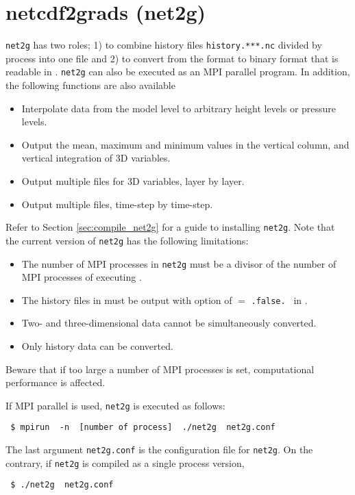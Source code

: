 \section{netcdf2grads (net2g)} \label{sec:net2g}


\verb|net2g| has two roles; 1) to combine history files \verb|history.***.nc| divided by process into one file
and 2) to convert from the \netcdf format to binary format that is readable in \grads.
\verb|net2g| can also be executed as an MPI parallel program.
%
In addition, the following functions are also available
\begin{itemize}
 \item Interpolate data from the model level to arbitrary height levels or pressure levels.
 \item Output the mean, maximum and minimum values in the vertical column,
 and vertical integration of 3D variables.
 \item Output multiple files for 3D variables, layer by layer.
 \item Output multiple files, time-step by time-step.
\end{itemize}


Refer to Section \ref{sec:compile_net2g} for a guide to installing \verb|net2g|.
Note that the current version of \verb|net2g| has the following limitations:
\begin{itemize}
 \item The number of MPI processes in \verb|net2g| must be a divisor of the number of MPI processes of executing \scalerm.
 \item The history files in \scalerm must be output with option of  $=$ \verb|.false. | in .
 \item Two- and three-dimensional data cannot be simultaneously converted.
 \item Only history data can be converted.
\end{itemize}
Beware that if too large a number of MPI processes is set,
computational performance is affected.


If MPI parallel is used, \verb|net2g| is executed as follows:
\begin{verbatim}
 $ mpirun  -n  [number of process]  ./net2g  net2g.conf
\end{verbatim}
The last argument \verb|net2g.conf| is the configuration file for \verb|net2g|.
On the contrary, if \verb|net2g| is compiled as a single process version,
\begin{verbatim}
 $ ./net2g  net2g.conf
\end{verbatim}

